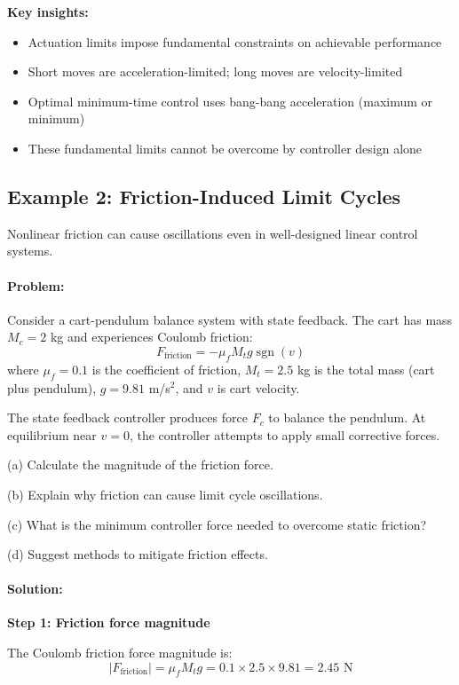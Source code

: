 \documentclass[11pt,a4paper]{article}
\begin{document}
\textbf{Key insights:}
\begin{itemize}
\item Actuation limits impose fundamental constraints on achievable performance
\item Short moves are acceleration-limited; long moves are velocity-limited
\item Optimal minimum-time control uses bang-bang acceleration (maximum or minimum)
\item These fundamental limits cannot be overcome by controller design alone
\end{itemize}

\subsection{Example 2: Friction-Induced Limit Cycles}

Nonlinear friction can cause oscillations even in well-designed linear control systems.

\paragraph{Problem:}
Consider a cart-pendulum balance system with state feedback. The cart has mass $M_c = 2$ kg and experiences Coulomb friction:
\[
F_{\text{friction}} = -\mu_f M_t g \operatorname{sgn}(v)
\]
where $\mu_f = 0.1$ is the coefficient of friction, $M_t = 2.5$ kg is the total mass (cart plus pendulum), $g = 9.81$ m/s$^2$, and $v$ is cart velocity.

The state feedback controller produces force $F_c$ to balance the pendulum. At equilibrium near $v = 0$, the controller attempts to apply small corrective forces.

(a) Calculate the magnitude of the friction force.

(b) Explain why friction can cause limit cycle oscillations.

(c) What is the minimum controller force needed to overcome static friction?

(d) Suggest methods to mitigate friction effects.

\paragraph{Solution:}

\textbf{Step 1: Friction force magnitude}

The Coulomb friction force magnitude is:
\[
|F_{\text{friction}}| = \mu_f M_t g = 0.1 \times 2.5 \times 9.81 = 2.45 \text{ N}
\]
\end{document}
